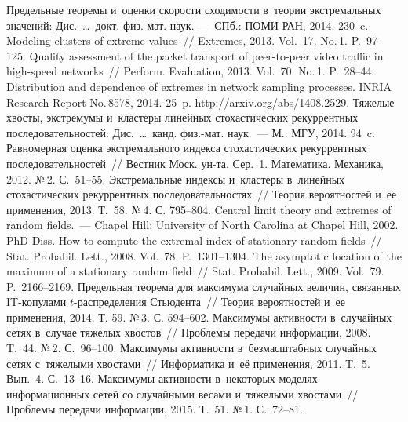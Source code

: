 \begin{multicols}{2}
{{\begin{thebibliography}{99}
 Предельные теоремы и~оценки ско\-рости сходимости
в~теории экстремальных значений: Дис.~\ldots\ докт. физ.-мат. наук.~---
СПб.: ПОМИ РАН, 2014. 230~c.
 Modeling clusters of extreme values~// Extremes, 2013.
Vol.~17. No.\,1. P.~97--125.
 Quality assessment of the packet transport of
peer-to-peer video traffic in high-speed networks~// Perform. Evaluation, 2013.
Vol.~70. No.\,1. P.~28--44.
 Distribution
and dependence of extremes in network sampling processes. INRIA
Research Report No.\,8578, 2014. 25~p.
{\sf http://arxiv.org/abs/1408.2529}.
 Тяжелые хвосты, экстремумы и~кластеры линейных
стохастических рекуррентных последовательностей: Дис.\ \ldots\ канд.
физ.-мат. наук.~--- М.: МГУ, 2014. 94~c.
 Равномерная оценка экстремального индекса стохастических
рекуррентных последовательностей~// Вестник Моск. ун-та. Сер.~1. Математика.
Механика, 2012. №\,2. С.~51--55.
 Экстремальные индексы и~кластеры в~линейных
стохастических рекуррентных последовательностях~// Теория
вероятностей и~ее применения, 2013. Т.~58. №\,4. С. 795--804.
 Central limit theory and extremes of random fields.~--- Chapel Hill:
University of North Carolina at Chapel Hill, 2002.  PhD Diss.
 How to compute the extremal index of stationary
random fields~//
Stat. Probabil. Lett., 2008. Vol.~78. P.~1301--1304.
 The asymptotic location of the maximum of a stationary random field~//
Stat. Probabil. Lett., 2009. Vol.~79. P.~2166--2169.
 Предельная теорема для максимума случайных величин,
связанных IT-ко\-пу\-ла\-ми $t$-рас\-пре\-де\-ле\-ния Стьюдента~//
Теория вероятностей
и~ее применения, 2014. Т. 59. №\,3. С. 594--602.
 Максимумы активности в~случайных сетях
в~случае тяжелых хвостов~// Проблемы передачи информации, 2008. T.~44.
№\,2. С.~96--100.
 Максимумы активности в~безмасштабных случайных сетях
с~тяжелыми хвостами~// Информатика и~её применения, 2011. T.~5. Вып.~4. С.~13--16.
 Максимумы активности в~некоторых моделях информационных сетей
со случайными весами и~тяжелыми хвостами~// Проблемы передачи информации, 2015. Т.~51.
№\,1. С.~72--81.

\end{thebibliography}}}
\end{multicols}
